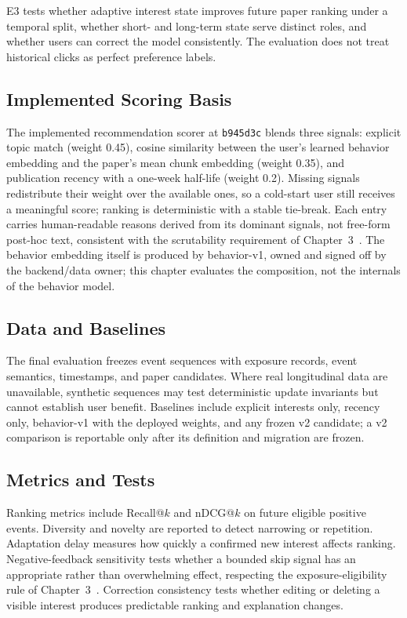 E3 tests whether adaptive interest state improves future paper ranking under a temporal split, whether short- and long-term state serve distinct roles, and whether users can correct the model consistently.
The evaluation does not treat historical clicks as perfect preference labels.

\subsection{Implemented Scoring Basis}

The implemented recommendation scorer at \texttt{b945d3c} blends three signals: explicit topic match (weight 0.45), cosine similarity between the user's learned behavior embedding and the paper's mean chunk embedding (weight 0.35), and publication recency with a one-week half-life (weight 0.2).
Missing signals redistribute their weight over the available ones, so a cold-start user still receives a meaningful score; ranking is deterministic with a stable tie-break.
Each entry carries human-readable reasons derived from its dominant signals, not free-form post-hoc text, consistent with the scrutability requirement of Chapter~3~\cite{ramos2024scrutable}.
The behavior embedding itself is produced by behavior-v1, owned and signed off by the backend/data owner; this chapter evaluates the composition, not the internals of the behavior model.

\subsection{Data and Baselines}

The final evaluation freezes event sequences with exposure records, event semantics, timestamps, and paper candidates.
Where real longitudinal data are unavailable, synthetic sequences may test deterministic update invariants but cannot establish user benefit.
Baselines include explicit interests only, recency only, behavior-v1 with the deployed weights, and any frozen v2 candidate; a v2 comparison is reportable only after its definition and migration are frozen.

\subsection{Metrics and Tests}

Ranking metrics include Recall@\(k\) and nDCG@\(k\) on future eligible positive events.
Diversity and novelty are reported to detect narrowing or repetition.
Adaptation delay measures how quickly a confirmed new interest affects ranking.
Negative-feedback sensitivity tests whether a bounded skip signal has an appropriate rather than overwhelming effect, respecting the exposure-eligibility rule of Chapter~3~\cite{zhang2025unpaired}.
Correction consistency tests whether editing or deleting a visible interest produces predictable ranking and explanation changes.


